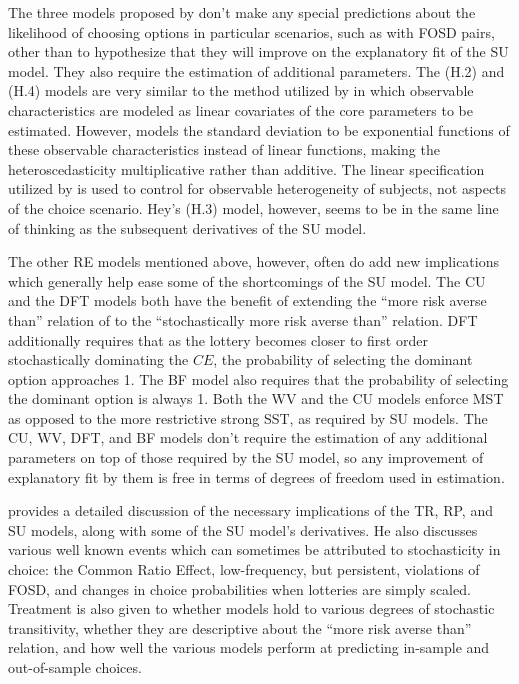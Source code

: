 \documentclass[11pt,a4paper]{report}
\newcommand\CE{\ensuremath{\mathit{CE}}}    %
\begin{document}
The three models proposed by \textcite{Hey1995} don't make any special predictions about the likelihood of choosing options in particular scenarios, such as with FOSD pairs, other than to hypothesize that they will improve on the explanatory fit of the SU model.
They also require the estimation of additional parameters.
The (H.2) and (H.4) models are very similar to the method utilized by \textcite[142]{Harrison2008a} in which observable characteristics are modeled as linear covariates of the core parameters to be estimated.
However, \textcite{Hey1995} models the standard deviation to be exponential functions of these observable characteristics instead of linear functions, making the heteroscedasticity multiplicative rather than additive.
The linear specification utilized by \textcite{Harrison2008a} is used to control for observable heterogeneity of subjects, not aspects of the choice scenario.
Hey's (H.3) model, however, seems to be in the same line of thinking as the subsequent derivatives of the SU model.

The other RE models mentioned above, however, often do add new implications which generally help ease some of the shortcomings of the SU model.
The CU and the DFT models both have the benefit of extending the \enquote{more risk averse than} relation of \textcite{Pratt1964} to the \enquote{stochastically more risk averse than} relation.
DFT additionally requires that as the lottery becomes closer to first order stochastically dominating the {\CE}, the probability of selecting the dominant option approaches 1.
The BF model also requires that the probability of selecting the dominant option is always 1.
Both the WV and the CU models enforce MST as opposed to the more restrictive strong SST,  as required by SU models.
The CU, WV, DFT, and BF models don't require the estimation of any additional parameters on top of those required by the SU model, so any improvement of explanatory fit by them is free in terms of degrees of freedom used in estimation.

\textcite{Wilcox2008} provides a detailed discussion of the necessary implications of the TR, RP,  and SU models, along with some of the SU model's derivatives.
He also discusses various well known events which can sometimes be attributed to stochasticity in choice: the Common Ratio Effect, low-frequency, but persistent, violations of FOSD, and changes in choice probabilities when lotteries are simply scaled.{\footnotemark}
Treatment is also given to whether models hold to various degrees of stochastic transitivity, whether they are descriptive about the \enquote{more risk averse than} relation, and how well the various models perform at predicting in-sample and out-of-sample choices.{\footnotemark}
\end{document}
